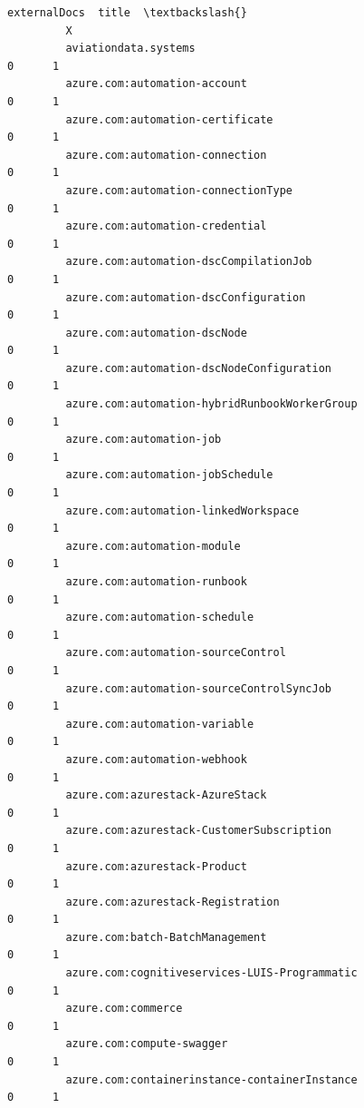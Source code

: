 \documentclass[11pt]{article}
\begin{document}
\begin{Verbatim}[commandchars=\\\{\}]
                                                           externalDocs  title  \textbackslash{}
         X                                                                       
         aviationdata.systems                                         0      1   
         azure.com:automation-account                                 0      1   
         azure.com:automation-certificate                             0      1   
         azure.com:automation-connection                              0      1   
         azure.com:automation-connectionType                          0      1   
         azure.com:automation-credential                              0      1   
         azure.com:automation-dscCompilationJob                       0      1   
         azure.com:automation-dscConfiguration                        0      1   
         azure.com:automation-dscNode                                 0      1   
         azure.com:automation-dscNodeConfiguration                    0      1   
         azure.com:automation-hybridRunbookWorkerGroup                0      1   
         azure.com:automation-job                                     0      1   
         azure.com:automation-jobSchedule                             0      1   
         azure.com:automation-linkedWorkspace                         0      1   
         azure.com:automation-module                                  0      1   
         azure.com:automation-runbook                                 0      1   
         azure.com:automation-schedule                                0      1   
         azure.com:automation-sourceControl                           0      1   
         azure.com:automation-sourceControlSyncJob                    0      1   
         azure.com:automation-variable                                0      1   
         azure.com:automation-webhook                                 0      1   
         azure.com:azurestack-AzureStack                              0      1   
         azure.com:azurestack-CustomerSubscription                    0      1   
         azure.com:azurestack-Product                                 0      1   
         azure.com:azurestack-Registration                            0      1   
         azure.com:batch-BatchManagement                              0      1   
         azure.com:cognitiveservices-LUIS-Programmatic                0      1   
         azure.com:commerce                                           0      1   
         azure.com:compute-swagger                                    0      1   
         azure.com:containerinstance-containerInstance                0      1   

\end{Verbatim}
\end{document}
